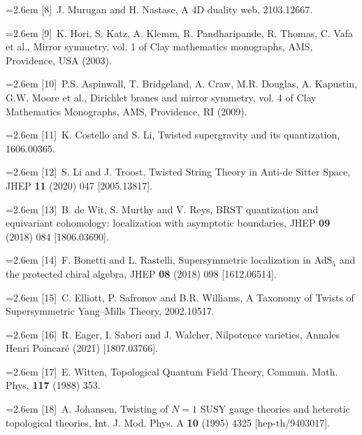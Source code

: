 \par\noindent\hangindent=2.6em [8]~J. Murugan and H. Nastase, A 4D duality web, 2103.12667.

\par\noindent\hangindent=2.6em [9]~K. Hori, S. Katz, A. Klemm, R. Pandharipande, R. Thomas, C. Vafa et al., Mirror symmetry, vol. 1 of Clay mathematics monographs, AMS, Providence, USA (2003).

\par\noindent\hangindent=2.6em [10]~P.S. Aspinwall, T. Bridgeland, A. Craw, M.R. Douglas, A. Kapustin, G.W. Moore et al., Dirichlet branes and mirror symmetry, vol. 4 of Clay Mathematics Monographs, AMS, Providence, RI (2009).

\par\noindent\hangindent=2.6em [11]~K. Costello and S. Li, Twisted supergravity and its quantization, 1606.00365.

\par\noindent\hangindent=2.6em [12]~S. Li and J. Troost, Twisted String Theory in Anti-de Sitter Space, JHEP \textbf{11} (2020) 047 [2005.13817].

\par\noindent\hangindent=2.6em [13]~B. de Wit, S. Murthy and V. Reys, BRST quantization and equivariant cohomology: localization with asymptotic boundaries, JHEP \textbf{09} (2018) 084 [1806.03690].

\par\noindent\hangindent=2.6em [14]~F. Bonetti and L. Rastelli, Supersymmetric localization in AdS$_5$ and the protected chiral algebra, JHEP \textbf{08} (2018) 098 [1612.06514].

\par\noindent\hangindent=2.6em [15]~C. Elliott, P. Safronov and B.R. Williams, A Taxonomy of Twists of Supersymmetric Yang--Mills Theory, 2002.10517.

\par\noindent\hangindent=2.6em [16]~R. Eager, I. Saberi and J. Walcher, Nilpotence varieties, Annales Henri Poincaré (2021) [1807.03766].

\par\noindent\hangindent=2.6em [17]~E. Witten, Topological Quantum Field Theory, Commun. Math. Phys. \textbf{117} (1988) 353.


\par\noindent\hangindent=2.6em [18]~A. Johansen, Twisting of $N=1$ SUSY gauge theories and heterotic topological theories, Int. J. Mod. Phys. A \textbf{10} (1995) 4325 [hep-th/9403017].


